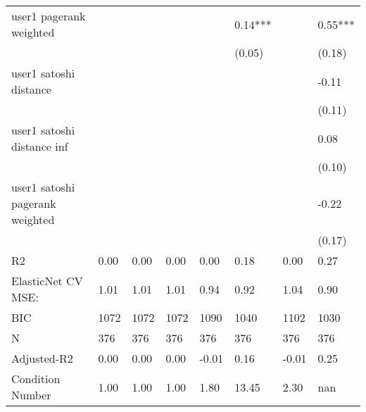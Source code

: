 \begin{table*}
\begin{center}
\begin{tabular}{llllllll}
user1 pagerank weighted                        &          &            &         &         & 0.14***  &                    & 0.55***  \\
                                               &          &            &         &         & (0.05)   &                    & (0.18)   \\
user1 satoshi distance                         &          &            &         &         &          &                    & -0.11    \\
                                               &          &            &         &         &          &                    & (0.11)   \\
user1 satoshi distance inf                     &          &            &         &         &          &                    & 0.08     \\
                                               &          &            &         &         &          &                    & (0.10)   \\
user1 satoshi pagerank weighted                &          &            &         &         &          &                    & -0.22    \\
                                               &          &            &         &         &          &                    & (0.17)   \\
R2                                             & 0.00     & 0.00       & 0.00    & 0.00    & 0.18     & 0.00               & 0.27     \\
ElasticNet CV MSE:                             & 1.01     & 1.01       & 1.01    & 0.94    & 0.92     & 1.04               & 0.90     \\
BIC                                            & 1072     & 1072       & 1072    & 1090    & 1040     & 1102               & 1030     \\
N                                              & 376      & 376        & 376     & 376     & 376      & 376                & 376      \\
Adjusted-R2                                    & 0.00     & 0.00       & 0.00    & -0.01   & 0.16     & -0.01              & 0.25     \\
Condition Number                               & 1.00     & 1.00       & 1.00    & 1.80    & 13.45    & 2.30               & nan      \\
\hline
\end{tabular}
\end{center}
\end{table*}
